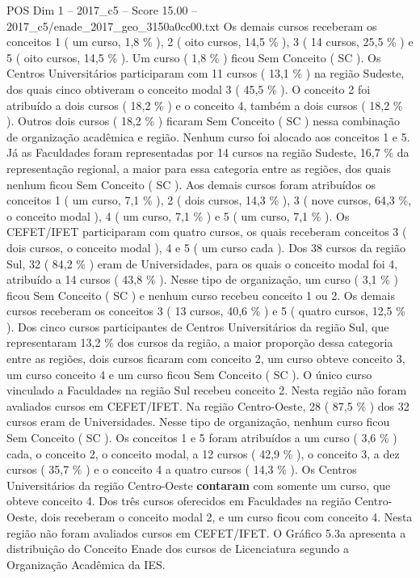 \begin{textsample}{POS Dim 1 – 2017\_c5 – Score 15.00 – 2017\_c5/enade\_2017\_geo\_3150a0cc00.txt}
Os demais cursos receberam os conceitos 1 ( um curso, 1,8 \% ), 2 ( oito cursos, 14,5 \% ), 3 ( 14 cursos, 25,5 \% ) e 5 ( oito cursos, 14,5 \% ).
Um curso ( 1,8 \% ) ficou Sem Conceito ( SC ).
Os Centros Universitários participaram com 11 cursos ( 13,1 \% ) na região Sudeste, dos quais cinco obtiveram o conceito modal 3 ( 45,5 \% ).
O conceito 2 foi atribuído a dois cursos ( 18,2 \% ) e o conceito 4, também a dois cursos ( 18,2 \% ).
Outros dois cursos ( 18,2 \% ) ficaram Sem Conceito ( SC ) nessa combinação de organização acadêmica e região.
Nenhum curso foi alocado aos conceitos 1 e 5.
Já as Faculdades foram representadas por 14 cursos na região Sudeste, 16,7 \% da representação regional, a maior para essa categoria entre as regiões, dos quais nenhum ficou Sem Conceito ( SC ).
Aos demais cursos foram atribuídos os conceitos 1 ( um curso, 7,1 \% ), 2 ( dois cursos, 14,3 \% ), 3 ( nove cursos, 64,3 \%, o conceito modal ), 4 ( um curso, 7,1 \% ) e 5 ( um curso, 7,1 \% ).
Os CEFET/IFET participaram com quatro cursos, os quais receberam conceitos 3 ( dois cursos, o conceito modal ), 4 e 5 ( um curso cada ).
Dos 38 cursos da região Sul, 32 ( 84,2 \% ) eram de Universidades, para os quais o conceito modal foi 4, atribuído a 14 cursos ( 43,8 \% ).
Nesse tipo de organização, um curso ( 3,1 \% ) ficou Sem Conceito ( SC ) e nenhum curso recebeu conceito 1 ou 2.
Os demais cursos receberam os conceitos 3 ( 13 cursos, 40,6 \% ) e 5 ( quatro cursos, 12,5 \% ).
Dos cinco cursos participantes de Centros Universitários da região Sul, que representaram 13,2 \% dos cursos da região, a maior proporção dessa categoria entre as regiões, dois cursos ficaram com conceito 2, um curso obteve conceito 3, um curso conceito 4 e um curso ficou Sem Conceito ( SC ).
O único curso vinculado a Faculdades na região Sul recebeu conceito 2.
Nesta região não foram avaliados cursos em CEFET/IFET.
Na região Centro-Oeste, 28 ( 87,5 \% ) dos 32 cursos eram de Universidades.
Nesse tipo de organização, nenhum curso ficou Sem Conceito ( SC ).
Os conceitos 1 e 5 foram atribuídos a um curso ( 3,6 \% ) cada, o conceito 2, o conceito modal, a 12 cursos ( 42,9 \% ), o conceito 3, a dez cursos ( 35,7 \% ) e o conceito 4 a quatro cursos ( 14,3 \% ).
Os Centros Universitários da região Centro-Oeste \textbf{contaram} com somente um curso, que obteve conceito 4.
Dos três cursos oferecidos em Faculdades na região Centro-Oeste, dois receberam o conceito modal 2, e um curso ficou com conceito 4.
Nesta região não foram avaliados cursos em CEFET/IFET.
O Gráfico 5.3a apresenta a distribuição do Conceito Enade dos cursos de Licenciatura segundo a Organização Acadêmica da IES.

\end{textsample}
